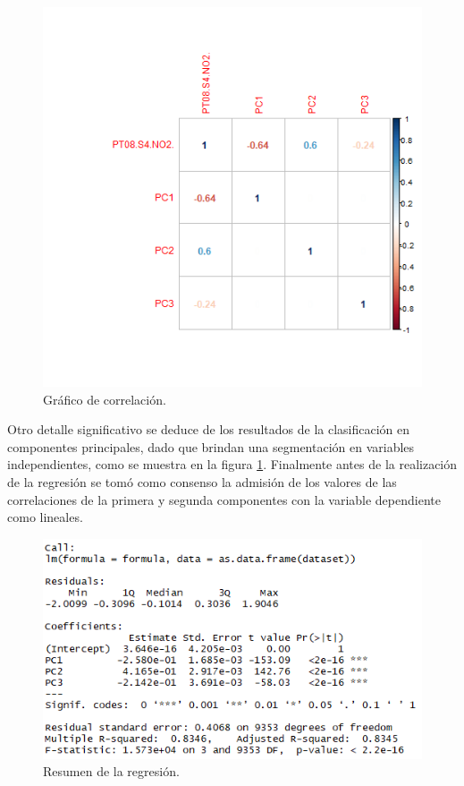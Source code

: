\documentclass[a4paper,10pt,twocolumn]{article}
\begin{document}
  \begin{figure}[htb]%
  	\begin{center}
  		\includegraphics[width=\linewidth]{Images/correlation2.png}
  	\end{center}
  	\caption{Gráfico de correlación.}
  	\label{fig:correlation2}
  \end{figure}

  Otro detalle significativo se deduce de los resultados de la clasificación en componentes principales, dado que brindan una segmentación en variables independientes, como se muestra en la figura \ref{fig:correlation2}. Finalmente antes de la realización de la regresión se tomó como consenso la admisión de los valores de las correlaciones de la primera y segunda componentes con la variable dependiente como lineales.
  
  \begin{figure}[htb]%
  	\begin{center}
  		\includegraphics[width=\linewidth]{Images/regression1.png}
  	\end{center}
  	\caption{Resumen de la regresión.}
  	\label{fig:regression1}
  \end{figure}
\end{document}
